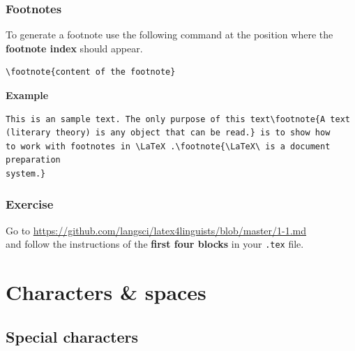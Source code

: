 \begin{frame}[fragile]
\frametitle{Footnotes}

To generate a footnote use the following command at the position where the \textbf{footnote index} should appear. 

\begin{lstlisting}
\footnote{content of the footnote}
\end{lstlisting}

\noindent \textbf{Example}
\begin{lstlisting}
This is an sample text. The only purpose of this text\footnote{A text 
(literary theory) is any object that can be read.} is to show how 
to work with footnotes in \LaTeX .\footnote{\LaTeX\ is a document preparation 
system.}
\end{lstlisting}

%

\end{frame}


\begin{frame}[fragile]
\frametitle{Exercise}

Go to \url{https://github.com/langsci/latex4linguists/blob/master/1-1.md}\\
and follow the instructions of the \textbf{first four blocks} in your \texttt{.tex} file.

\end{frame}


\section{Characters \& spaces}


\subsection{Special characters}

